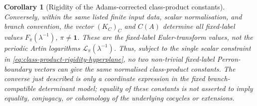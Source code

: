 \documentclass[11pt,a4paper]{amsart}
\theoremstyle{plain}
\newtheorem{corollary}[theorem]{Corollary}
\theoremstyle{definition}
\theoremstyle{remark}
\begin{document}
\begin{corollary}[Rigidity of the Adams-corrected class-product constants]
  Conversely, within the same listed finite input data, scalar normalisation,
  and branch convention, the vector \((K_C)_C\) and \(C(A)\) determine all
  fixed-label values \(F_\pi(\lambda^{-1})\), \(\pi\neq\mathbf1\). These are the
  fixed-label Euler-transform values, not the periodic Artin logarithms
  \(\mathcal L_\pi(\lambda^{-1})\). Thus, subject to the single scalar
  constraint in \eqref{eq:class-product-rigidity-hyperplane}, no two
  non-trivial fixed-label Perron-boundary vectors can give the same
  normalised class-product constants.  The converse just described is only
  a coordinate expression in the fixed branch-compatible determinant model;
  equality of these
  constants is not asserted to imply equality, conjugacy, or cohomology of
  the underlying cocycles or extensions.
\end{corollary}
\end{document}
